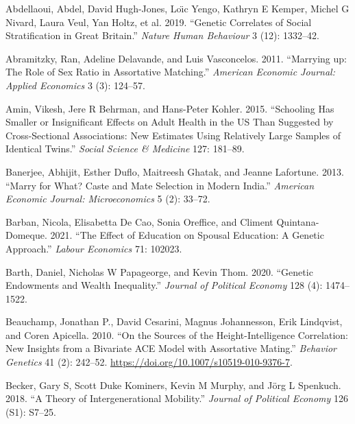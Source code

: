 \documentclass[
]{article}
\newlength{\cslhangindent}
\newlength{\cslentryspacingunit} %
\newenvironment{CSLReferences}[2] %
 {%
  \setlength{\parindent}{0pt}
  \ifodd #1
  \let\oldpar\par
  \def\par{\hangindent=\cslhangindent\oldpar}
  \fi
  \setlength{\parskip}{#2\cslentryspacingunit}
 }%
 {}
\theoremstyle{definition}
\theoremstyle{definition}
\theoremstyle{definition}
\theoremstyle{definition}
\theoremstyle{remark}
\begin{document}
\hypertarget{refs}{}
\begin{CSLReferences}{1}{0}
\leavevmode{}%
Abdellaoui, Abdel, David Hugh-Jones, Loı̈c Yengo, Kathryn E Kemper, Michel G Nivard, Laura Veul, Yan Holtz, et al. 2019. {``Genetic Correlates of Social Stratification in Great Britain.''} \emph{Nature Human Behaviour} 3 (12): 1332--42.

\leavevmode{}%
Abramitzky, Ran, Adeline Delavande, and Luis Vasconcelos. 2011. {``Marrying up: The Role of Sex Ratio in Assortative Matching.''} \emph{American Economic Journal: Applied Economics} 3 (3): 124--57.

\leavevmode{}%
Amin, Vikesh, Jere R Behrman, and Hans-Peter Kohler. 2015. {``Schooling Has Smaller or Insignificant Effects on Adult Health in the US Than Suggested by Cross-Sectional Associations: New Estimates Using Relatively Large Samples of Identical Twins.''} \emph{Social Science \& Medicine} 127: 181--89.

\leavevmode{}%
Banerjee, Abhijit, Esther Duflo, Maitreesh Ghatak, and Jeanne Lafortune. 2013. {``Marry for What? Caste and Mate Selection in Modern India.''} \emph{American Economic Journal: Microeconomics} 5 (2): 33--72.

\leavevmode{}%
Barban, Nicola, Elisabetta De Cao, Sonia Oreffice, and Climent Quintana-Domeque. 2021. {``The Effect of Education on Spousal Education: A Genetic Approach.''} \emph{Labour Economics} 71: 102023.

\leavevmode{}%
Barth, Daniel, Nicholas W Papageorge, and Kevin Thom. 2020. {``Genetic Endowments and Wealth Inequality.''} \emph{Journal of Political Economy} 128 (4): 1474--1522.

\leavevmode{}%
Beauchamp, Jonathan P., David Cesarini, Magnus Johannesson, Erik Lindqvist, and Coren Apicella. 2010. {``On the Sources of the Height-Intelligence Correlation: New Insights from a Bivariate {ACE} Model with Assortative Mating.''} \emph{Behavior Genetics} 41 (2): 242--52. \url{https://doi.org/10.1007/s10519-010-9376-7}.

\leavevmode{}%
Becker, Gary S, Scott Duke Kominers, Kevin M Murphy, and Jörg L Spenkuch. 2018. {``A Theory of Intergenerational Mobility.''} \emph{Journal of Political Economy} 126 (S1): S7--25.


\end{CSLReferences}
\end{document}
